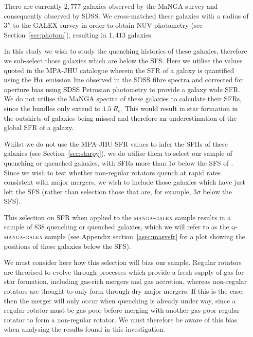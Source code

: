 \documentclass[useAMS,usenatbib]{mn2e}
\begin{document}
There are currently $2,777$ galaxies observed by the MaNGA survey and consequently observed by SDSS. We cross-matched these galaxies with a radius of $3''$ to the GALEX survey in order to obtain NUV photometry (see Section~\ref{sec:photom}), resulting in $1,413$ galaxies.

In this study we wish to study the quenching histories of these galaxies, therefore we sub-select those galaxies which are below the SFS. Here we utilise the values quoted in the MPA-JHU catalogue \citep{kauffmann03, brinchmann04} wherein the SFR of a galaxy is quantified using the $\rm{H}\alpha$ emission line observed in the SDSS fibre spectra and corrected for aperture bias using SDSS Petrosian photometry to provide a galaxy wide SFR. We do not utilise the MaNGA spectra of these galaxies to calculate their SFRs, since the bundles only extend to $1.5~R_e$. This would result in star formation in the outskirts of galaxies being missed and therefore an underestimation of the global SFR of a galaxy. 

Whilst we do not use the MPA-JHU SFR values to infer the SFHs of these galaxies (see Section~\ref{sec:starpy}), we do utilise them to select our sample of quenching or quenched galaxies, with SFRs more than $1\sigma$ below the SFS of \cite{peng10}. Since we wish to test whether non-regular rotators quench at rapid rates consistent with major mergers, we wish to include those galaxies which have just left the SFS (rather than selection those that are, for example, $3\sigma$ below the SFS).


This selection on SFR when applied to the \textsc{manga-galex} sample results in a sample of $838$ quenching or quenched galaxies, which we will refer to as the \textsc{q-manga-galex} sample (see Appendix section~\ref{asec:masvsfr} for a plot showing the positions of these galaxies below the SFS). 

We must consider here how this selection will bias our sample. Regular rotators are theorised to evolve through processes which provide a fresh supply of gas for star formation, including gas-rich mergers and gas accretion, whereas non-regular rotators are thought to only form through dry major mergers. If this is the case, then the merger will only occur when quenching is already under way, since a regular rotator must be gas poor before merging with another gas poor regular rotator to form a non-regular rotator. We must therefore be aware of this bias when analysing the results found in this investigation.  
\end{document}
